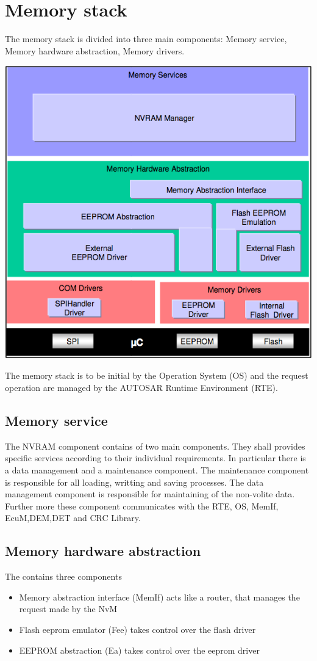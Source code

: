 \section{Memory stack }
The memory stack is divided into three main components: Memory service, Memory hardware abstraction, Memory drivers.
\begin{center}
\includegraphics[scale=0.60]{Images/Figure2_1.png}\\
\end{center}
The memory stack is to be initial by the Operation System (OS) and the request operation are managed by the AUTOSAR Runtime Environment (RTE).\newpage
\subsection{Memory service}
The NVRAM component contains of two main components. They shall provides specific services according to their individual requirements. In particular there is a data management and a maintenance component. The maintenance component is responsible for all loading, writting and saving processes. The data management component is responsible for maintaining  of the non-volite data. Further more these component communicates with the RTE, OS, MemIf, EcuM,DEM,DET and CRC Library. 
\subsection{Memory hardware abstraction}
The contains three components
\begin{itemize}
\item Memory abstraction interface (MemIf) acts like a router, that manages the request made by the NvM
\item Flash eeprom emulator (Fee) takes control over the flash driver
\item EEPROM abstraction (Ea) takes control over the eeprom driver
\end{itemize}
